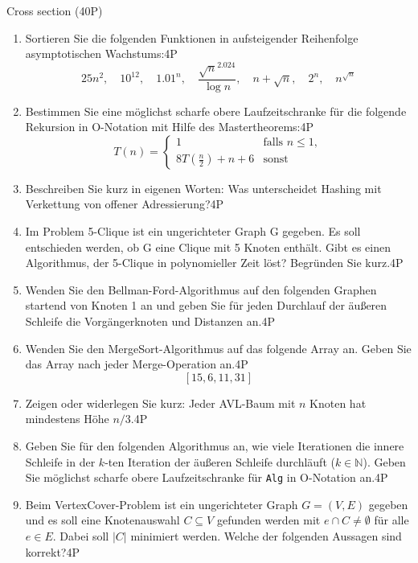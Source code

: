 \documentclass{article}
\begin{document}
\begin{exercise}{Cross section (40P)}
  \begin{enumerate}
    \item Sortieren Sie die folgenden Funktionen in aufsteigender Reihenfolge asymptotischen Wachstums:\hfill 4P\[
            25n^2,\quad 10^{12},\quad {1.01}^n,\quad \frac{\sqrt{n}^{2.024}}{\log n},\quad n + \sqrt{n},\quad 2^n,\quad n^{\sqrt{n}}
          \]
    \item Bestimmen Sie eine möglichst scharfe obere Laufzeitschranke für die folgende Rekursion in O-Notation mit Hilfe des Mastertheorems:\hfill{4P}\[
            T(n) =\begin{cases}
              1                                 & \text{falls } n \leq 1, \\
              8T\left(\frac{n}{2}\right) + n +6 & \text{sonst}
            \end{cases}
          \]
    \item Beschreiben Sie kurz in eigenen Worten: Was unterscheidet Hashing mit Verkettung von offener Adressierung?\hfill 4P
    \item Im Problem 5-Clique ist ein ungerichteter Graph G gegeben. Es soll entschieden werden, ob G eine Clique mit 5 Knoten enthält. Gibt es einen Algorithmus, der 5-Clique in polynomieller Zeit löst? Begründen Sie kurz.\hfill 4P
    \item Wenden Sie den Bellman-Ford-Algorithmus auf den folgenden Graphen startend von Knoten 1 an und geben Sie für jeden Durchlauf der äußeren Schleife die Vorgängerknoten und Distanzen an.\hfill 4P
          
    \item Wenden Sie den MergeSort-Algorithmus auf das folgende Array an. Geben Sie das Array nach jeder Merge-Operation an.\hfill 4P\[
            [15,6,11,31]
          \]
    \item Zeigen oder widerlegen Sie kurz: Jeder AVL-Baum mit $n$ Knoten hat mindestens Höhe $n/3$.\hfill 4P
    \item Geben Sie für den folgenden Algorithmus an, wie viele Iterationen die innere Schleife in der $k$-ten Iteration der äußeren Schleife durchläuft ($k \in \mathbb{N}$). Geben Sie möglichst scharfe obere Laufzeitschranke für \texttt{Alg} in O-Notation an.\hfill 4P\par
          
    \item Beim VertexCover-Problem ist ein ungerichteter Graph $G = (V,E)$ gegeben und es soll eine Knotenauswahl $C \subseteq V$ gefunden werden mit $e \cap C \neq \emptyset$ für alle $e \in E$. Dabei soll $|C|$ minimiert werden. Welche der folgenden Aussagen sind korrekt?\hfill 4P

\end{enumerate}
\end{exercise}
\end{document}
